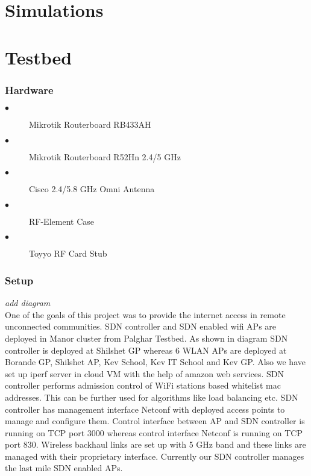\documentclass[12pt]{article}
\begin{document}
 \section {Simulations}   
 \section{Testbed}
   \subsubsection{Hardware}
       \begin{description}
	   	\item[$\bullet$] Mikrotik Routerboard RB433AH 
	   	\item[$\bullet$] Mikrotik Routerboard R52Hn 2.4/5 GHz
	   	\item[$\bullet$] Cisco 2.4/5.8 GHz Omni Antenna
	   	\item[$\bullet$] RF-Element Case
	   	\item[$\bullet$] Toyyo RF Card Stub
	   	\end{description}
   	 \subsubsection{Setup}
   	 \textit{add diagram}\\
   	 One of the goals of this project was to provide the internet access in remote unconnected communities. 
  SDN controller and SDN enabled wifi APs are deployed in Manor cluster from Palghar Testbed. As shown in diagram SDN controller is deployed at Shilshet GP whereas 6 WLAN APs are deployed at Borande GP, Shilshet AP, Kev School, Kev IT School and Kev GP. Also we have set up iperf server in cloud VM with the help of amazon web services. SDN controller performs admission control of WiFi stations based whitelist mac addresses. This can be further used for algorithms like load balancing etc. SDN controller has management interface Netconf with deployed access points to manage and configure them. Control interface between AP and SDN controller is running on TCP port 3000 whereas control interface Netconf is running on TCP port 830. Wireless backhaul links are set up with 5 GHz band and these links are managed with their proprietary interface. Currently our SDN controller manages the last mile SDN enabled APs.  	 
   
   
    
    
    
  
\end{document}
